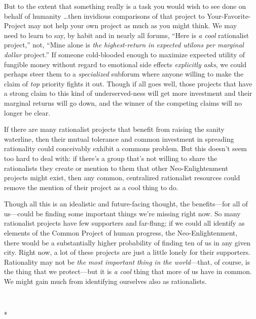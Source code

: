 {
 But to the extent that something really is a task you would wish
to see done on behalf of humanity \ldots then invidious comparisons of
that project to Your-Favorite-Project may not help your own project as
much as you might think. We may need to learn to say, by habit and in
nearly all forums, ``Here is \textit{a cool}
rationalist project,'' not, ``Mine
alone is \textit{the highest-return in expected utilons per marginal
dollar} project.'' If someone cold-blooded enough to
maximize expected utility of fungible money without regard to emotional
side effects \textit{explicitly asks}, we could perhaps steer them to a
\textit{specialized} subforum where anyone willing to make the claim of
\textit{top} priority fights it out. Though if all goes well, those
projects that have a strong claim to this kind of underserved-ness will
get more investment and their marginal returns will go down, and the
winner of the competing claims will no longer be clear.}

{
 If there are many rationalist projects that benefit from raising
the sanity waterline, then their mutual tolerance and common investment
in spreading rationality could conceivably exhibit a commons problem.
But this doesn't seem too hard to deal with: if
there's a group that's not willing to
share the rationalists they create or mention to them that other
Neo-Enlightenment projects might exist, then any common, centralized
rationalist resources could remove the mention of their project as a
cool thing to do.}

{
 Though all this is an idealistic and future-facing thought, the
benefits---for all of us---could be finding some important things
we're missing right now. So many rationalist projects
have few supporters and far-flung; if we could all identify as elements
of the Common Project of human progress, the Neo-Enlightenment, there
would be a substantially higher probability of finding ten of us in any
given city. Right now, a lot of these projects are just a little lonely
for their supporters. Rationality may not be \textit{the most important
thing in the world}{}---that, of course, is the thing that we
protect---but it is \textit{a cool} thing that more of us have in
common. We might gain much from identifying ourselves also as
rationalists.}

{\centering
 \ ~
\par}

{\centering
 *
\par}


